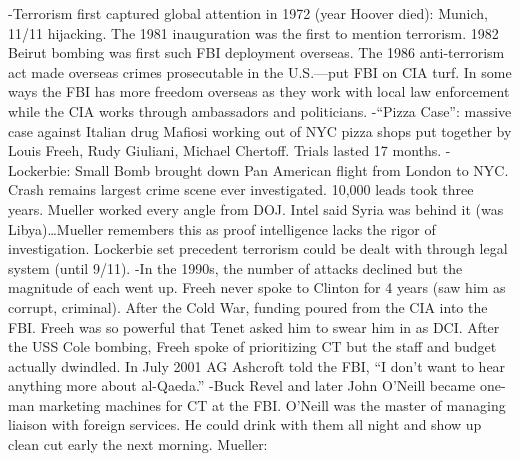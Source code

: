 \documentclass[
]{article}
\begin{document}
-Terrorism first captured global attention in 1972 (year Hoover died):
Munich, 11/11 hijacking. The 1981 inauguration was the first to mention
terrorism. 1982 Beirut bombing was first such FBI deployment overseas.
The 1986 anti-terrorism act made overseas crimes prosecutable in the
U.S.---put FBI on CIA turf. In some ways the FBI has more freedom
overseas as they work with local law enforcement while the CIA works
through ambassadors and politicians. -``Pizza Case'': massive case
against Italian drug Mafiosi working out of NYC pizza shops put together
by Louis Freeh, Rudy Giuliani, Michael Chertoff. Trials lasted 17
months. -Lockerbie: Small Bomb brought down Pan American flight from
London to NYC. Crash remains largest crime scene ever investigated.
10,000 leads took three years. Mueller worked every angle from DOJ.
Intel said Syria was behind it (was Libya)\ldots Mueller remembers this
as proof intelligence lacks the rigor of investigation. Lockerbie set
precedent terrorism could be dealt with through legal system (until
9/11). -In the 1990s, the number of attacks declined but the magnitude
of each went up. Freeh never spoke to Clinton for 4 years (saw him as
corrupt, criminal). After the Cold War, funding poured from the CIA into
the FBI. Freeh was so powerful that Tenet asked him to swear him in as
DCI. After the USS Cole bombing, Freeh spoke of prioritizing CT but the
staff and budget actually dwindled. In July 2001 AG Ashcroft told the
FBI, ``I don't want to hear anything more about al-Qaeda.'' -Buck Revel
and later John O'Neill became one-man marketing machines for CT at the
FBI. O'Neill was the master of managing liaison with foreign services.
He could drink with them all night and show up clean cut early the next
morning. Mueller:
\end{document}
